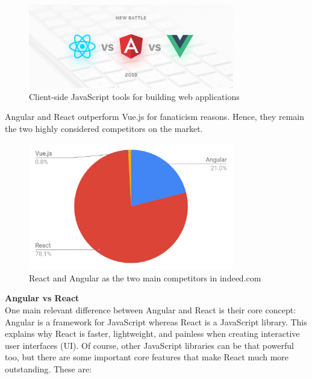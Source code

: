 \begin{figure}
    \centering
        \includegraphics[width=0.8\textwidth]{images/angular.jpeg}
        \caption{Client-side JavaScript tools for building web applications}
\end{figure}

Angular and React outperform Vue.js for fanaticism reasons. Hence, they remain the two highly considered competitors on the market.\\

\begin{figure}
    \centering
        \includegraphics[width=0.8\textwidth]{images/chart_angular.png}
        \caption{React and Angular as the two main competitors in indeed.com}
\end{figure}

\vspace{1.0cm}
\noindent
\textbf{Angular vs React}\\
One main relevant difference between Angular and React is their core concept: Angular is a framework for JavaScript whereas React is a JavaScript library. This explains why React is faster, lightweight, and painless when creating interactive user interfaces (UI).
Of course, other JavaScript libraries can be that powerful too, but there are some important core features that make React much more outstanding. These are:

